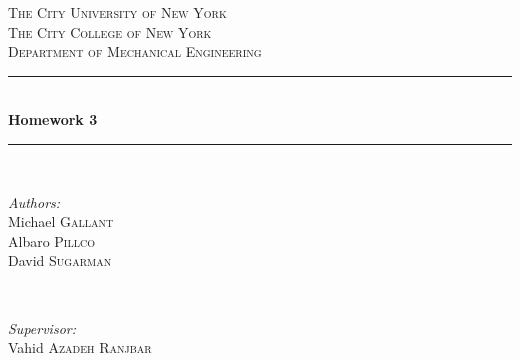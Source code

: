 \documentclass[12pt,letterpaper,notitlepage]{article}
\begin{document}
\begin{titlepage}

\newcommand{\HRule}{\rule{\linewidth}{0.5mm}} %

\center %


\textsc{\LARGE The City University of New York}\\[1cm] %
\textsc{\Large The City College of New York}\\[0.5cm] %
\textsc{\large Department of Mechanical Engineering}\\[0.5cm] %


\HRule \\[0.4cm]
{ \huge \bfseries Homework 3}\\[0.4cm] %
\HRule \\[1.5cm]


\begin{minipage}{0.4\textwidth}
\begin{flushleft} \large
\emph{Authors:}\\
Michael \textsc{Gallant}\\
Albaro \textsc{Pillco}\\
David \textsc{Sugarman}\\
\end{flushleft}
\end{minipage}
~
\begin{minipage}{0.4\textwidth}
\begin{flushright} \large
\emph{Supervisor:} \\
Vahid \textsc{Azadeh Ranjbar} %
\end{flushright}
\end{minipage}\\[2cm]


\end{titlepage}
\end{document}
